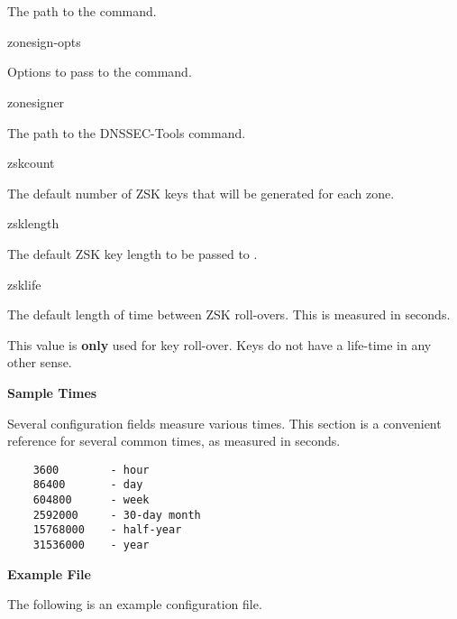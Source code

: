 \begin{description}
The path to the  command.

\item zonesign-opts\verb" "

Options to pass to the  command.

\item zonesigner\verb" "

The path to the DNSSEC-Tools  command.

\item zskcount\verb" "

The default number of ZSK keys that will be generated for each zone.

\item zsklength\verb" "

The default ZSK key length to be passed to .

\item zsklife\verb" "

The default length of time between ZSK roll-overs.  This is measured in
seconds.

This value is {\bf only} used for key roll-over.  Keys do not have a life-time
in any other sense.

\end{description}

{\bf Sample Times}

Several configuration fields measure various times.  This section is a
convenient reference for several common times, as measured in seconds.

\begin{verbatim}
    3600        - hour
    86400       - day
    604800      - week
    2592000     - 30-day month
    15768000    - half-year
    31536000    - year
\end{verbatim}

{\bf Example File}

The following is an example  configuration file.

